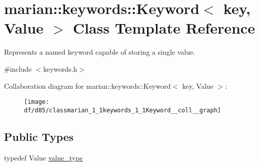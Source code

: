 \hypertarget{classmarian_1_1keywords_1_1Keyword}{}\section{marian\+:\+:keywords\+:\+:Keyword$<$ key, Value $>$ Class Template Reference}
\label{classmarian_1_1keywords_1_1Keyword}


Represents a named keyword capable of storing a single value.  




{\ttfamily \#include $<$keywords.\+h$>$}



Collaboration diagram for marian\+:\+:keywords\+:\+:Keyword$<$ key, Value $>$\+:
\nopagebreak
\begin{figure}[H]
\begin{center}
\leavevmode
\texttt{[image: df/d85/classmarian\_1\_1keywords\_1\_1Keyword\_\_coll\_\_graph]}
\end{center}
\end{figure}
\subsection*{Public Types}
\begin{DoxyCompactItemize}
\item 
typedef Value \hyperlink{classmarian_1_1keywords_1_1Keyword_a698b7031d0c11fd5cfb783edb8f6d480}{value\+\_\+type}
\end{DoxyCompactItemize}
